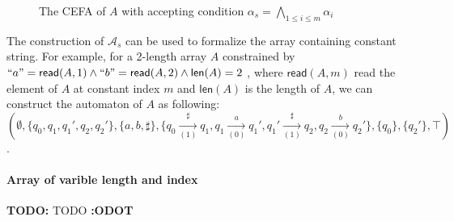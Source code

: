 \documentclass[12pt]{article}
\newcommand*{\aut}{\mathcal{A}}
\newcommand{\arrconcat}{\sharp}
\newcommand{\todo}[1]{{\color{orange}\textbf{TODO:} #1 \textbf{:ODOT}\color{black}}}
\newcommand{\mylen}{\mathsf{len}}
\newcommand{\myread}{\mathsf{read}}
\theoremstyle{remark}
\begin{document}
{\begin{figure}[H]
\begin{tikzpicture}[initial text =, initial distance=3ex,
                node distance=1.2cm, auto,
                state/.style={circle, draw, inner sep=0pt, minimum size=5mm},
                accepting by double]
        \end{tikzpicture}
        \caption{The CEFA of $A$ with accepting condition $\alpha_s = \bigwedge\limits_{1\leq i \leq m} \alpha_i$}
        \label{fig:fixed_len_cons_idx}
    \end{figure}
    The construction of $\aut_s$ can be used to formalize the array containing constant string. For example, for a 2-length array $A$ constrained by $``a" = \myread(A, 1)\wedge ``b" = \myread(A, 2) \wedge \mylen(A) = 2$ , where $\myread(A, m)$ read the  element of $A$ at constant index $m$ and $\mylen(A)$ is the length of $A$, we can construct the automaton of $A$ as following: \\
    $(\emptyset, \{q_0,q_1,q_1',q_2,q_2'\}, \{a,b,\arrconcat\}, \{q_0\xrightarrow[(1)]{\arrconcat}q_1, q_1\xrightarrow[(0)]{a}q_1', q_1'\xrightarrow[(1)]{\arrconcat}q_2, q_2\xrightarrow[(0)]{b}q_2'\}, \{q_0\}, \{q_2'\}, \top)$. 
    \paragraph{Array of varible length and index} \todo{TODO}
}%
\end{document}
